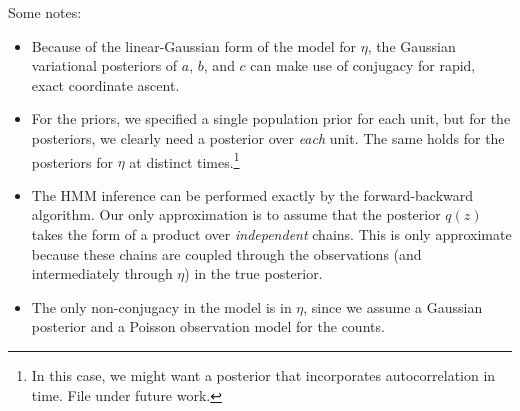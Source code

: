 \documentclass[11pt]{article}
\begin{document}
Some notes:
\begin{itemize}
    \item Because of the linear-Gaussian form of the model for $\eta$, the Gaussian variational posteriors of $a$, $b$, and $c$ can make use of conjugacy for rapid, exact coordinate ascent.
    \item For the priors, we specified a single population prior for each unit, but for the posteriors, we clearly need a posterior over \emph{each} unit. The same holds for the posteriors for $\eta$ at distinct times.\footnote{In this case, we might want a posterior that incorporates autocorrelation in time. File under future work.}
    \item The HMM inference can be performed exactly by the forward-backward algorithm. Our only approximation is to assume that the posterior $q(z)$ takes the form of a product over \emph{independent} chains. This is only approximate because these chains are coupled through the observations (and intermediately through $\eta$) in the true posterior.
    \item The only non-conjugacy in the model is in $\eta$, since we assume a Gaussian posterior and a Poisson observation model for the counts.
\end{itemize}
\end{document}
